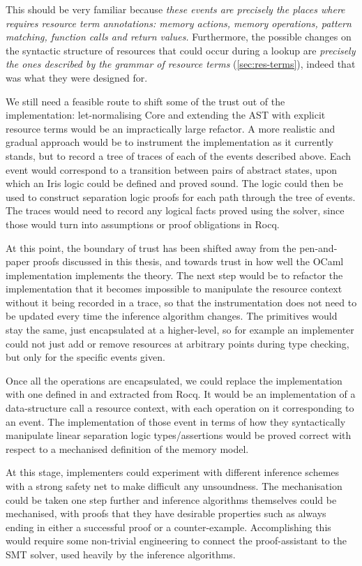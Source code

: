 This should be very familiar because \emph{these events are precisely the
places where  requires resource term annotations: memory actions,
memory operations, pattern matching, function calls and return values.}
Furthermore, the possible changes on the syntactic structure of resources that
could occur during a lookup are \emph{precisely the ones described by the
grammar of resource terms} (\cref{sec:res-terms}), indeed that was what they
were designed for.

We still need a feasible route to shift some of the trust out of the 
implementation: let-normalising Core and extending the AST with explicit
resource terms would be an impractically large refactor. A more realistic and
gradual approach would be to instrument the  implementation as it
currently stands, but to record a tree of traces of each of the events
described above. Each event would correspond to a transition between pairs of
 abstract states, upon which an Iris logic could be defined and
proved sound. The logic could then be used to construct separation logic proofs
for each path through the tree of events. The traces would need to record any
logical facts proved using the solver, since those would turn into assumptions
or proof obligations in Rocq.

At this point, the boundary of trust has been shifted away from the
pen-and-paper proofs discussed in this thesis, and towards trust in how well
the OCaml implementation implements the theory. The next step would be to
refactor the implementation that it becomes impossible to manipulate the
resource context without it being recorded in a trace, so that the
instrumentation does not need to be updated every time the inference algorithm
changes. The primitives would stay the same, just encapsulated at a
higher-level, so for example an implementer could not just add or remove
resources at arbitrary points during type checking, but only for the specific
events given.

Once all the operations are encapsulated, we could replace the implementation
with one defined in and extracted from Rocq. It would be an implementation of a
data-structure call a resource context, with each operation on it corresponding
to an event. The implementation of those event in terms of how they
syntactically manipulate linear separation logic types/assertions would be
proved correct with respect to a mechanised definition of the 
memory model.

At this stage,  implementers could experiment with different inference
schemes with a strong safety net to make difficult any unsoundness. The
mechanisation could be taken one step further and inference algorithms
themselves could be mechanised, with proofs that they have desirable properties
such as always ending in either a successful proof or a counter-example.
Accomplishing this would require some non-trivial engineering to connect the
proof-assistant to the SMT solver, used heavily by the inference algorithms.

